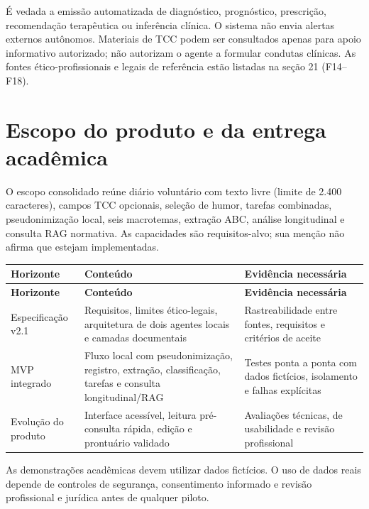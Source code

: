 \documentclass[11pt,a4paper]{article}
\begin{document}
É vedada a emissão automatizada de diagnóstico, prognóstico, prescrição, recomendação terapêutica ou inferência clínica. O sistema não envia alertas externos autônomos. Materiais de TCC podem ser consultados apenas para apoio informativo autorizado; não autorizam o agente a formular condutas clínicas. As fontes ético-profissionais e legais de referência estão listadas na seção 21 (F14–F18).

\section{Escopo do produto e da entrega acadêmica}
O escopo consolidado reúne diário voluntário com texto livre (limite de 2.400 caracteres), campos TCC opcionais, seleção de humor, tarefas combinadas, pseudonimização local, seis macrotemas, extração ABC, análise longitudinal e consulta RAG normativa. As capacidades são requisitos-alvo; sua menção não afirma que estejam implementadas.

\begingroup\small
\begin{longtable}{>{\raggedright\arraybackslash}p{}>{\raggedright\arraybackslash}p{}>{\raggedright\arraybackslash}p{}}
\toprule
\textbf{Horizonte} & \textbf{Conteúdo} & \textbf{Evidência necessária} \\ \midrule\endfirsthead
\toprule
\textbf{Horizonte} & \textbf{Conteúdo} & \textbf{Evidência necessária} \\ \midrule\endhead
\bottomrule\endfoot
Especificação v2.1 & Requisitos, limites ético-legais, arquitetura de dois agentes locais e camadas documentais & Rastreabilidade entre fontes, requisitos e critérios de aceite \\[3pt]
MVP integrado & Fluxo local com pseudonimização, registro, extração, classificação, tarefas e consulta longitudinal/RAG & Testes ponta a ponta com dados fictícios, isolamento e falhas explícitas \\[3pt]
Evolução do produto & Interface acessível, leitura pré-consulta rápida, edição e prontuário validado & Avaliações técnicas, de usabilidade e revisão profissional \\[3pt]
\end{longtable}
\endgroup
As demonstrações acadêmicas devem utilizar dados fictícios. O uso de dados reais depende de controles de segurança, consentimento informado e revisão profissional e jurídica antes de qualquer piloto.
\end{document}
